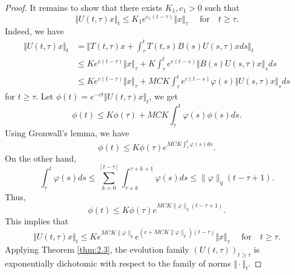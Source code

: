 \documentclass[reqno]{amsart}
\begin{document}
\begin{proof}
It remains to show that there exists $K_1, c_1>0$ such that
\begin{equation*}
\Vert U(t,\tau)x\Vert _t \leq K_1e^{c_1(t-\tau)}\Vert x\Vert _{\tau} \quad \text{ for} \quad t\geq \tau. \label{2.27}
\end{equation*}
Indeed, we have
\begin{align*}
\Vert U(t,\tau)x \Vert _t &=\Big\Vert T(t,\tau)x + \displaystyle \int_{\tau}^t T(t,s)B(s)U(s,\tau)xds\Big\Vert _t\\
&\leq Ke^{c(t-\tau)}\Vert x\Vert _{\tau} + K \displaystyle \int_{\tau}^t e^{c(t-s)}\Vert B(s)U(s,\tau)x\Vert _sds\\
&\leq  Ke^{c(t-\tau)}\Vert x\Vert _{\tau} + MCK \displaystyle \int_{\tau}^t e^{c(t-s)} \varphi(s) \Vert U(s,\tau)x\Vert _sds
\end{align*}
for $t \geq \tau$. Let $\phi (t)=e^{-ct}\Vert U(t,\tau)x\Vert _t$, we get
$$ \phi (t) \leq K\phi (\tau)+MCK \displaystyle \int_{\tau}^t  \varphi(s) \phi (s)ds. $$
Using Gronwall's lemma, we have
$$ \phi (t) \leq K\phi(\tau)e^{MCK  \displaystyle\int_{\tau}^t  \varphi(s) ds}.$$
On the other hand,
$$ \int_{\tau}^t  \varphi(s) ds \le \sum_{k=0}^{[t-\tau]}\int_{\tau+k}^{\tau +k+1}\varphi(s) ds \le \|\varphi\|_q (t-\tau +1).$$
Thus,
$$ \phi (t) \leq K\phi(\tau)e^{MCK \|\varphi\|_q (t-\tau +1) }. $$
This implies that
$$ \Vert U(t,\tau)x\Vert _t \le  Ke^{MCK\|\varphi\|_q}e^{(c+MCK \|\varphi\|_q)(t-\tau)}  \Vert x\Vert _{\tau} \quad \text{ for} \quad t\geq \tau. $$
Applying Theorem \ref{thm:2.3}, the evolution family  $(U(t,\tau))_{t\ge \tau}$ is exponentially dichotomic with respect to the family of norms $\Vert \cdot\Vert _t$.
\end{proof}
\end{document}
